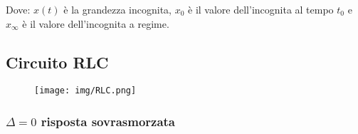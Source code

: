 \documentclass{article}
\begin{document}
\medskip
\noindent{}
\medskip

\noindent Dove: $x(t)$ è la grandezza incognita, $x_0$ è il valore dell'incognita al tempo $t_0$ e $x_\infty$ è il valore dell'incognita a regime.
\pagebreak

\subsection{Circuito RLC}

\medskip
\noindent{}

\begin{figure}[h!]
    \begin{center}
        \texttt{[image: img/RLC.png]}
    \end{center}
\end{figure}

\subsubsection{$\Delta=0$ risposta sovrasmorzata}
\end{document}
